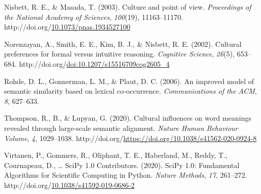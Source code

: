 \documentclass[10pt, letterpaper]{article}
\newenvironment{CSLReferences}%
  {}%
  {\par}
\begin{document}
\begin{CSLReferences}{1}{0}
\leavevmode{}%
Nisbett, R. E., \& Masada, T. (2003). Culture and point of view.
\emph{Proceedings of the National Academy of Sciences}, \emph{100}(19),
11163--11170.
http://doi.org/\href{https://doi.org/10.1073/pnas.1934527100}{10.1073/pnas.1934527100}

\leavevmode{}%
Norenzayan, A., Smith, E. E., Kim, B. J., \& Nisbett, R. E. (2002).
Cultural preferences for formal versus intuitive reasoning.
\emph{Cognitive Science}, \emph{26}(5), 653--684.
http://doi.org/\href{https://doi.org/doi:10.1207/s15516709cog2605_4}{doi:10.1207/s15516709cog2605\_4}

\leavevmode{}%
Rohde, D. L., Gonnerman, L. M., \& Plaut, D. C. (2006). An improved
model of semantic similarity based on lexical co‐occurrence.
\emph{Communications of the ACM}, \emph{8}, 627--633.

\leavevmode{}%
Thompson, R., B., \& Lupyan, G. (2020). Cultural influences on word
meanings revealed through large-scale semantic alignment. \emph{Nature
Human Behaviour Volume}, \emph{4}, 1029--1038.
http://doi.org/\url{https://doi.org/10.1038/s41562-020-0924-8}

\leavevmode{}%
Virtanen, P., Gommers, R., Oliphant, T. E., Haberland, M., Reddy, T.,
Cournapeau, D., \ldots{} SciPy 1.0 Contributors. (2020). {{SciPy} 1.0:
Fundamental Algorithms for Scientific Computing in Python}. \emph{Nature
Methods}, \emph{17}, 261--272.
http://doi.org/\href{https://doi.org/10.1038/s41592-019-0686-2}{10.1038/s41592-019-0686-2}

\end{CSLReferences}


\end{document}
